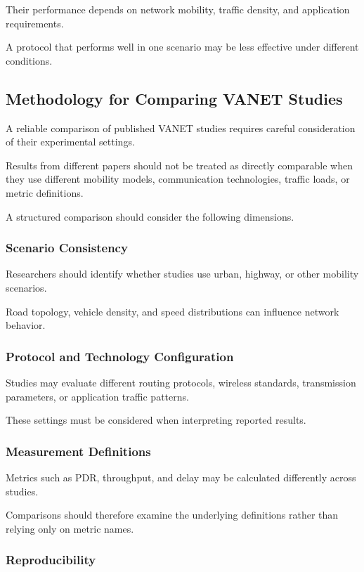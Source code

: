 Their performance depends on
network mobility, traffic density,
and application requirements.

A protocol that performs well
in one scenario may be less
effective under different
conditions.

\subsection{Methodology for Comparing VANET Studies}
\label{sec:4F}

A reliable comparison of published
VANET studies requires careful
consideration of their
experimental settings.

Results from different papers
should not be treated as directly
comparable when they use different
mobility models, communication
technologies, traffic loads,
or metric definitions.

A structured comparison should
consider the following dimensions.

\subsubsection{Scenario Consistency}

Researchers should identify
whether studies use urban,
highway, or other mobility
scenarios.

Road topology, vehicle density,
and speed distributions can
influence network behavior.

\subsubsection{Protocol and Technology Configuration}

Studies may evaluate different
routing protocols, wireless
standards, transmission parameters,
or application traffic patterns.

These settings must be considered
when interpreting reported results.

\subsubsection{Measurement Definitions}

Metrics such as PDR, throughput,
and delay may be calculated
differently across studies.

Comparisons should therefore
examine the underlying definitions
rather than relying only on
metric names.

\subsubsection{Reproducibility}

